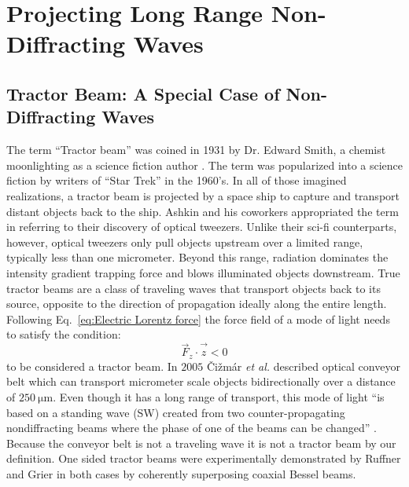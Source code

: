 \chapter{Projecting Long Range Non-Diffracting Waves}
\label{ch:intermediate}

\section{Tractor Beam: A Special Case of  Non-Diffracting Waves}

The term ``Tractor beam'' was coined in 1931 by Dr. Edward Smith, a chemist moonlighting as a science fiction author \cite{lasbury_1970, nasa_paul}. The term was popularized into a science fiction by writers of ``Star Trek'' in the 1960's. In all of those imagined realizations, a tractor beam is projected by a space ship to capture and transport distant objects back to the ship. 
Ashkin and his coworkers \cite{block1992} appropriated the term in referring to their discovery of optical tweezers. Unlike their sci-fi counterparts, however, optical tweezers only pull objects upstream over a limited range, typically less than one micrometer. Beyond this range, radiation dominates the intensity gradient trapping force and blows illuminated objects downstream. True tractor beams are a class of traveling waves that transport objects back to its source, opposite to the direction of propagation ideally along the entire length. Following Eq.~\eqref{eq:Electric Lorentz force} the force field of a mode of light needs to satisfy the condition:
\begin{equation}
\label{eq:Tractor Fz condition}
\vec{F}_{z}\cdot \vec{\hat{z}} <0
\end{equation}
to be considered a tractor beam. In $2005 $ \v Ci\v zm\'ar \emph{et al.} \cite{cizmar2005} described optical conveyor belt which can transport micrometer scale objects bidirectionally over a distance of $\SI{250}{\um}$. Even though it has a long range of transport, this mode of light ``is based on a standing wave (SW) created from two counter-propagating nondiffracting beams where the phase of one of the beams can be changed'' \cite{cizmar2005}. Because the conveyor belt is not a traveling wave it is not a tractor beam by our definition. One sided tractor beams were experimentally demonstrated by Ruffner and Grier \cite{ruffner2012prl} in both cases by coherently superposing coaxial Bessel beams.

